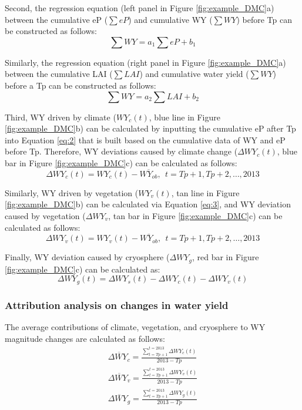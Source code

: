 \documentclass[hess, manuscript]{copernicus}
\begin{document}
Second, the regression equation (left panel in Figure \ref{fig:example_DMC}a) between the cumulative eP ($\sum eP$) and cumulative WY ($\sum WY$) before Tp can be constructed as follows:
\begin{equation} \label{eq:2}
    \sum WY = a_1\sum eP + b_1
\end{equation} 

Similarly, the regression equation (right panel in Figure \ref{fig:example_DMC}a) between the cumulative LAI ($\sum LAI$) and cumulative water yield ($\sum WY$) before a Tp can be constructed as follows:
\begin{equation} \label{eq:3}
    \sum WY = a_2\sum LAI + b_2
\end{equation}

Third, WY driven by climate ($WY_c(t)$, blue line in Figure \ref{fig:example_DMC}b) can be calculated by inputting the cumulative eP after Tp into Equation \ref{eq:2} that is built based on the cumulative data of WY and eP before Tp. Therefore, WY deviations caused by climate change ($\Delta WY_c(t)$, blue bar in Figure \ref{fig:example_DMC}c) can be calculated as follows:
\begin{equation}
    \Delta WY_{c}(t)=WY_{c}(t)-\overline{WY_{ob}}, \ \  t=Tp+1, Tp+2, \ldots, 2013
\end{equation}

Similarly, WY driven by vegetation ($WY_v(t)$, tan line in Figure \ref{fig:example_DMC}b) can be calculated via Equation \ref{eq:3}, and WY deviation caused by vegetation ($\Delta WY_v$, tan bar in Figure \ref{fig:example_DMC}c) can be calculated as follows:
\begin{equation}
    \Delta WY_{v}(t)=WY_{v}(t)-\overline{WY_{ob}}, \ \ t=Tp+1, Tp+2, \ldots, 2013
\end{equation}

Finally, WY deviation caused by cryosphere ($\Delta WY_g$, red bar in Figure \ref{fig:example_DMC}c) can be calculated as:
\begin{equation}
    \Delta WY_{g}(t)=\Delta WY_s(t)-\Delta WY_{c}(t)-\Delta WY_{v}(t)
\end{equation}

\subsubsection{Attribution analysis on changes in water yield}
The average contributions of climate, vegetation, and cryosphere to WY magnitude changes are calculated as follows:
\begin{equation}
    \begin{split}
        \overline{\Delta WY_{c}}=\frac{\sum_{t=Tp+1}^{t=2013} \Delta WY_{c}(t)}{2013-Tp}\\
        \overline{\Delta WY_{v}}=\frac{\sum_{t=Tp+1}^{t=2013} \Delta WY_{v}(t)}{2013-Tp}\\
        \overline{\Delta WY_{g}}=\frac{\sum_{t=Tp+1}^{t=2013} \Delta WY_{g}(t)}{2013-Tp}
    \end{split}
\end{equation}
\end{document}
